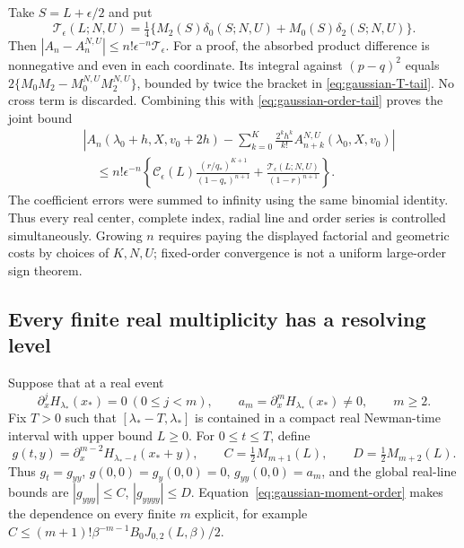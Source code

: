 Take \(S=L+\epsilon/2\) and put
\begin{equation}\label{eq:gaussian-T-tail}
 \mathcal T_\epsilon(L;N,U)=\tfrac14
  \{M_2(S)\delta_0(S;N,U)+M_0(S)\delta_2(S;N,U)\}.
\end{equation}
Then \(|A_n-A_n^{N,U}|\le n!\epsilon^{-n}\mathcal T_\epsilon\).
For a proof, the absorbed product difference is nonnegative and even in
each coordinate. Its integral against \((p-q)^2\) equals
\(2\{M_0M_2-M_0^{N,U}M_2^{N,U}\}\), bounded by twice the bracket
in \eqref{eq:gaussian-T-tail}. No cross term is discarded.
Combining this with \eqref{eq:gaussian-order-tail} proves the joint bound
\begin{align}\label{eq:gaussian-joint-tail}
 &\left|A_n(\lambda_0+h,X,v_0+2h)
   -\sum_{k=0}^K\frac{2^kh^k}{k!}A_{n+k}^{N,U}(\lambda_0,X,v_0)\right|
 \nonumber\\
 &\quad\le n!\epsilon^{-n}\left\{
 \mathcal C_\epsilon(L)\frac{(r/q_*)^{K+1}}{(1-q_*)^{n+1}}
 +\frac{\mathcal T_\epsilon(L;N,U)}{(1-r)^{n+1}}\right\}.
\end{align}
The coefficient errors were summed to infinity using the same binomial
identity. Thus every real center, complete index, radial line and order
series is controlled simultaneously. Growing \(n\) requires paying the
displayed factorial and geometric costs by choices of \(K,N,U\);
fixed-order convergence is not a uniform large-order sign theorem.

\subsection{Every finite real multiplicity has a resolving level}
Suppose that at a real event
\begin{equation}\label{eq:gaussian-event}
 \partial_x^jH_{\lambda_*}(x_*)=0\ (0\le j<m),\qquad
 a_m=\partial_x^mH_{\lambda_*}(x_*)\ne0,\qquad m\ge2.
\end{equation}
Fix \(T>0\) such that \([\lambda_*-T,\lambda_*]\) is contained in a
compact real Newman-time interval with upper bound \(L\ge0\).
For \(0\le t\le T\), define
\[
 g(t,y)=\partial_x^{m-2}H_{\lambda_*-t}(x_*+y),\qquad
 C=\tfrac12M_{m+1}(L),\qquad D=\tfrac12M_{m+2}(L).
\]
Thus \(g_t=g_{yy}\), \(g(0,0)=g_y(0,0)=0\), \(g_{yy}(0,0)=a_m\),
and the global real-line bounds are \(|g_{yyy}|\le C\),
\(|g_{yyyy}|\le D\). Equation~\eqref{eq:gaussian-moment-order}
makes the dependence on every finite \(m\) explicit, for example
\(C\le(m+1)!\beta^{-m-1}B_0J_{0,2}(L,\beta)/2\).

